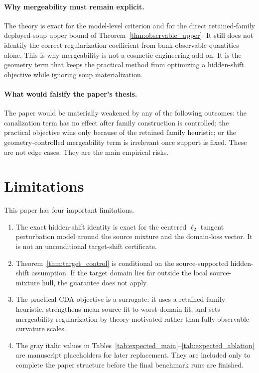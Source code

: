 \documentclass{article}
\theoremstyle{definition}
\newcommand{\cda}{\textup{\textsc{CDA}}}
\begin{document}
\paragraph{Why mergeability must remain explicit.}
The theory is exact for the model-level criterion and for the direct retained-family deployed-soup upper bound of Theorem~\ref{thm:observable_upper}. It still does not identify the correct regularization coefficient from bank-observable quantities alone. This is why mergeability is not a cosmetic engineering add-on. It is the geometry term that keeps the practical method from optimizing a hidden-shift objective while ignoring soup materialization.

\paragraph{What would falsify the paper's thesis.}
The paper would be materially weakened by any of the following outcomes: the canalization term has no effect after family construction is controlled; the practical objective wins only because of the retained family heuristic; or the geometry-controlled mergeability term is irrelevant once support is fixed. These are not edge cases. They are the main empirical risks.

\section{Limitations}

This paper has four important limitations.
\begin{enumerate}[leftmargin=1.3em]
    \item The exact hidden-shift identity is exact for the centered \(\ell_2\) tangent perturbation model around the source mixture and the domain-loss vector. It is not an unconditional target-shift certificate.
    \item Theorem~\ref{thm:target_control} is conditional on the source-supported hidden-shift assumption. If the target domain lies far outside the local source-mixture hull, the guarantee does not apply.
    \item The practical \cda{} objective is a surrogate: it uses a retained family heuristic, strengthens mean source fit to worst-domain fit, and sets mergeability regularization by theory-motivated rather than fully observable curvature scales.
    \item The gray italic values in Tables~\ref{tab:expected_main}--\ref{tab:expected_ablation} are manuscript placeholders for later replacement. They are included only to complete the paper structure before the final benchmark runs are finished.
\end{enumerate}
\end{document}
